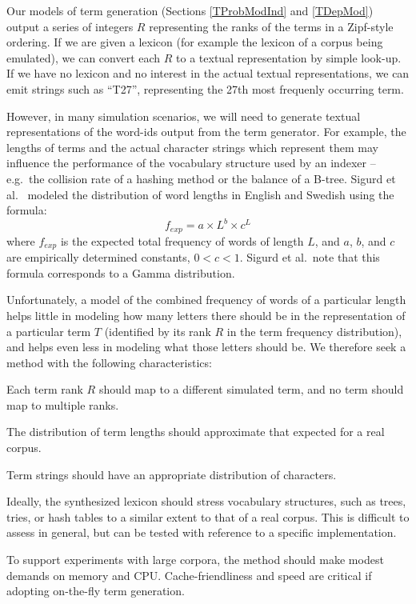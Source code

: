 \documentclass[11pt]{report}
\begin{document}
Our models of term generation (Sections \ref{TProbModInd} and
  \ref{TDepMod}) output a series of integers $R$ representing the
  ranks of the terms in a Zipf-style ordering.  If we are given a
  lexicon (for example the lexicon of a corpus being emulated), we can
  convert each $R$ to a textual representation by simple look-up.  If
  we have no lexicon and no interest in the actual textual
  representations, we can emit strings such as ``T27'', representing
  the 27th most frequenly occurring term.

However, in many simulation scenarios, we will need to generate
textual representations of the word-ids output from the term
generator.  For example, the lengths of terms and the actual character
strings which represent them may influence the performance of the
vocabulary structure used by an indexer -- e.g.~the collision rate of
a hashing method or the balance of a B-tree.  Sigurd et
al.~\cite{SigurdEW2004} modeled the distribution of word lengths in
English and Swedish using the formula:
\[
f_{exp} = a \times L^b \times c^L
\]
where $f_{exp}$ is the expected total frequency of words of length
$L$, and $a$, $b$, and $c$ are empirically determined constants, $0 <
c < 1$.  Sigurd et al.~note that this formula corresponds to a Gamma
distribution.

Unfortunately, a model of the combined frequency of words of a
particular length helps little in modeling how many letters there
should be in the representation of a particular term $T$ (identified
by its rank $R$ in the term frequency distribution), and helps even
less in modeling what those letters should be.  We therefore seek a
method with the following characteristics:

\begin{description}
\setlength{\itemsep}{-2pt}
	\item[One-to-one] Each term rank $R$ should map to a different
          simulated term, and no term should map to multiple ranks.

	\item[Term length] The distribution of term lengths should
          approximate that expected for a real corpus.

	\item[Character frequency] Term strings should have an
          appropriate distribution of characters.

        \item [Data structure friendliness] Ideally, the synthesized
          lexicon should stress vocabulary structures, such as trees,
          tries, or hash tables to a similar extent to that of a real
          corpus.  This is difficult to assess in general, but can be
          tested with reference to a specific implementation.

	\item[Resource usage] To support experiments with large
          corpora, the method should make modest demands on memory and
          CPU.  Cache-friendliness and speed are critical if adopting
          on-the-fly term generation.

\end{description}
\end{document}
